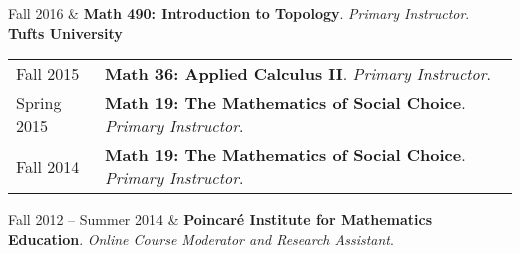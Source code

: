     \vspace{-1em}
      Fall 2016 & \textbf{{\normalfont Math 490:} Introduction to Topology}. \textit{Primary Instructor}.  \\ 


    \textbf{\large Tufts University}
    
    \begin{center}
    {
    \renewcommand{\arraystretch}{1.2}
    \begin{longtable}{p{}  p{}}
      Fall 2015 & \textbf{{\normalfont Math 36:} Applied Calculus II}. \textit{Primary Instructor}.  \\ 
  Spring 2015 & \textbf{{\normalfont Math 19:} The Mathematics of Social Choice}. \textit{Primary Instructor}.  \\ 
  Fall 2014 & \textbf{{\normalfont Math 19:} The Mathematics of Social Choice}. \textit{Primary Instructor}.  
    \end{longtable}
    } 
    \end{center}

    \vspace{-1em}
      Fall 2012 --   Summer 2014 & \textbf{Poincar\'e Institute for Mathematics Education}. \textit{Online Course Moderator and Research Assistant}.  \\ 
